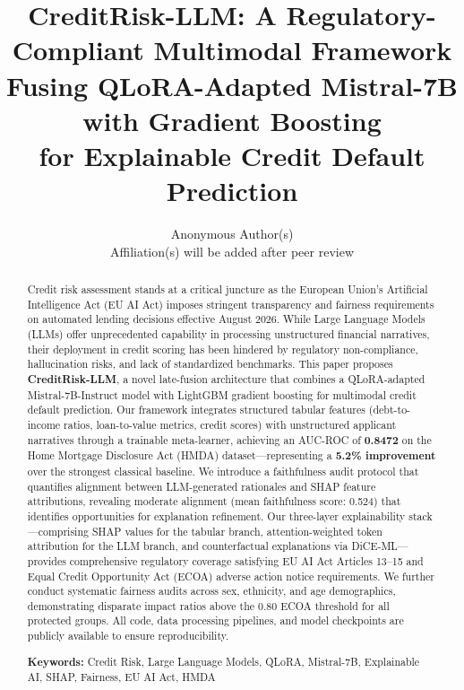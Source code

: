 \documentclass[11pt,a4paper]{article}
\title{\textbf{CreditRisk-LLM: A Regulatory-Compliant Multimodal Framework\\
Fusing QLoRA-Adapted Mistral-7B with Gradient Boosting\\
for Explainable Credit Default Prediction}}
\author{
    Anonymous Author(s) \\ 
    Affiliation(s) will be added after peer review
}
\date{}
\begin{document}
\maketitle

\begin{abstract}
Credit risk assessment stands at a critical juncture as the European Union's Artificial Intelligence Act (EU AI Act) imposes stringent transparency and fairness requirements on automated lending decisions effective August 2026. While Large Language Models (LLMs) offer unprecedented capability in processing unstructured financial narratives, their deployment in credit scoring has been hindered by regulatory non-compliance, hallucination risks, and lack of standardized benchmarks. This paper proposes \textbf{CreditRisk-LLM}, a novel late-fusion architecture that combines a QLoRA-adapted Mistral-7B-Instruct model with LightGBM gradient boosting for multimodal credit default prediction. Our framework integrates structured tabular features (debt-to-income ratios, loan-to-value metrics, credit scores) with unstructured applicant narratives through a trainable meta-learner, achieving an AUC-ROC of \textbf{0.8472} on the Home Mortgage Disclosure Act (HMDA) dataset---representing a \textbf{5.2\% improvement} over the strongest classical baseline. We introduce a faithfulness audit protocol that quantifies alignment between LLM-generated rationales and SHAP feature attributions, revealing moderate alignment (mean faithfulness score: 0.524) that identifies opportunities for explanation refinement. Our three-layer explainability stack---comprising SHAP values for the tabular branch, attention-weighted token attribution for the LLM branch, and counterfactual explanations via DiCE-ML---provides comprehensive regulatory coverage satisfying EU AI Act Articles 13--15 and Equal Credit Opportunity Act (ECOA) adverse action notice requirements. We further conduct systematic fairness audits across sex, ethnicity, and age demographics, demonstrating disparate impact ratios above the 0.80 ECOA threshold for all protected groups. All code, data processing pipelines, and model checkpoints are publicly available to ensure reproducibility.

\vspace{0.5em}
\noindent\textbf{Keywords:} Credit Risk, Large Language Models, QLoRA, Mistral-7B, Explainable AI, SHAP, Fairness, EU AI Act, HMDA
\end{abstract}
\end{document}
